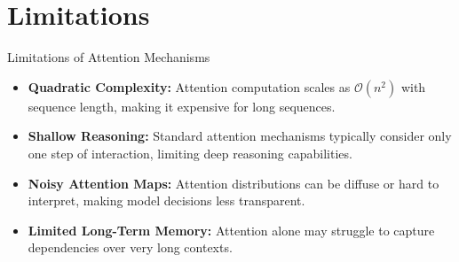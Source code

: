\section{Limitations}
\begin{frame}{Limitations of Attention Mechanisms}
  \begin{itemize}
    \item[$\blacktriangleright$] \textbf{Quadratic Complexity:} Attention computation scales as $\mathcal{O}(n^2)$ with sequence length, making it expensive for long sequences.
    \item[$\blacktriangleright$] \textbf{Shallow Reasoning:} Standard attention mechanisms typically consider only one step of interaction, limiting deep reasoning capabilities.
    \item[$\blacktriangleright$] \textbf{Noisy Attention Maps:} Attention distributions can be diffuse or hard to interpret, making model decisions less transparent.
    \item[$\blacktriangleright$] \textbf{Limited Long-Term Memory:} Attention alone may struggle to capture dependencies over very long contexts.
  \end{itemize}
\end{frame}